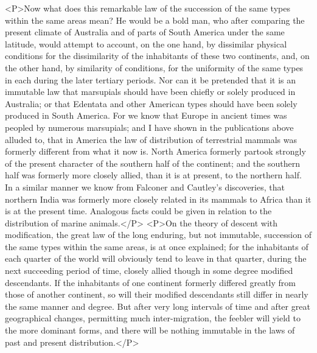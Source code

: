 <P>Now what does this remarkable law of the succession of the same types within the same areas mean? He would be a bold man, who after comparing the present climate of Australia and of parts of South America under the same latitude, would attempt to account, on the one hand, by dissimilar physical conditions for the dissimilarity of the inhabitants of these two continents, and, on the other hand, by similarity of conditions, for the uniformity of the same types in each during the later tertiary periods. Nor can it be pretended that it is an immutable law that marsupials should have been chiefly or solely produced in Australia; or that Edentata and other American types should have been solely produced in South America. For we know that Europe in ancient times was peopled by numerous marsupials; and I have shown in the publications above alluded to, that in America the law of distribution of terrestrial mammals was formerly different from what it now is. North America formerly partook strongly of the present character of the southern half of the continent; and the southern half was formerly more closely allied, than it is at present, to the northern half. In a similar manner we know from Falconer and Cautley's discoveries, that northern India was formerly more closely related in its mammals to Africa than it is at the present time. Analogous facts could be given in relation to the distribution of marine animals.</P>
<P>On the theory of descent with modification, the great law of the long enduring, but not immutable, succession of the same types within the same areas, is at once explained; for the inhabitants of each quarter of the world will obviously tend to leave in that quarter, during the next succeeding period of time, closely allied though in some degree modified descendants. If the inhabitants of one continent formerly differed greatly from those of another continent, so will their modified descendants still differ in nearly the same manner and degree. But after very long intervals of time and after great geographical changes, permitting much inter-migration, the feebler will yield to the more dominant forms, and there will be nothing immutable in the laws of past and present distribution.</P>
